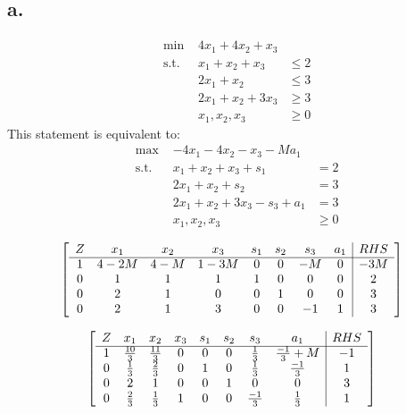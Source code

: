 \documentclass[10pt, letterpaper]{paper}
\begin{document}
\subsection*{a.}
\begin{equation*}
\begin{alignedat}{3}
&\text{min }&4x_1 + 4x_2 + x_3&\\
&\text{s.t. } &x_1 + x_2 +x_3 &\leq 2\\
& &2x_1 + x_2  &\leq 3\\
& &2x_1 + x_2 + 3x_3 &\geq 3\\
& &x_1, x_2, x_3 &\geq 0
\end{alignedat}
\end{equation*}
This statement is equivalent to: 
\begin{equation*}
\begin{alignedat}{3}
&\text{max }&-4x_1 - 4x_2 - x_3 -Ma_1&\\
&\text{s.t. } &x_1 + x_2 +x_3 + s_1 &= 2\\
& &2x_1 + x_2 + s_2  &= 3\\
& &2x_1 + x_2 + 3x_3 - s_3 + a_1 &= 3\\
& &x_1, x_2, x_3 &\geq 0
\end{alignedat}
\end{equation*}

\[
	\left[ {\begin{array}{cccccccc|c}
	Z & x_1 & x_2 & x_3 & s_1 & s_2 & s_3 & a_1 & RHS\\ \cline{1-9}
	1 & 4 - 2M & 4- M & 1 - 3M & 0 & 0 & -M & 0 & -3M \\
	0 & 1 & 1 & 1 & 1 & 0 & 0 & 0 & 2 \\
	0 & 2 & 1 & 0 & 0 & 1 & 0 & 0 & 3  \\
	0 & 2 & 1 & 3 & 0 & 0 & -1 & 1 & 3  \\
	\end{array} } \right]
\]

\[
	\left[ {\begin{array}{cccccccc|c}
	Z & x_1 & x_2 & x_3 & s_1 & s_2 & s_3 & a_1 & RHS\\ \cline{1-9}
	1 & \frac{10}{3} & \frac{11}{3} & 0 & 0 & 0 & \frac{1}{3} & \frac{-1}{3} +M & -1 \\
	0 & \frac{1}{3} & \frac{2}{3} & 0 & 1 & 0 & \frac{1}{3} & \frac{-1}{3} & 1 \\
	0 & 2 & 1 & 0 & 0 & 1 & 0 & 0 & 3  \\
	0 & \frac{2}{3} & \frac{1}{3} & 1 & 0 & 0 & \frac{-1}{3} & \frac{1}{3} & 1  \\
	\end{array} } \right]
\]
\end{document}
